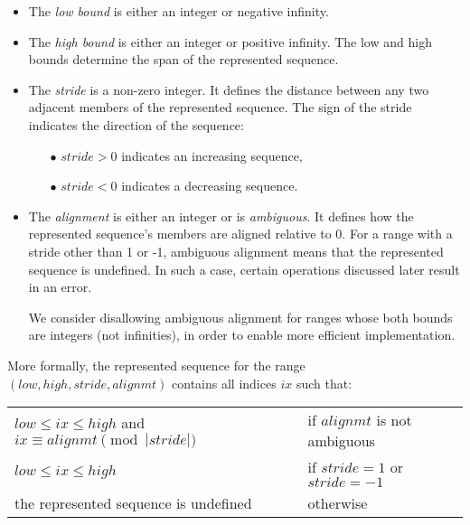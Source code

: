 \begin{itemize}

\item The \emph{low bound} is either an integer or negative infinity.

\item The \emph{high bound} is either an integer or positive infinity.
  The low and high bounds determine the span of the represented sequence.

\item The \emph{stride} is a non-zero integer.
  It defines the distance between any two adjacent members of the
  represented sequence.
  The sign of the stride indicates the direction of the sequence:
  \begin{itemize}
  \item[$\bullet$] $stride > 0$ indicates an increasing sequence,
  \item[$\bullet$] $stride < 0$ indicates a decreasing sequence.
  \end{itemize}

\item The \emph{alignment} is either an integer or is \emph{ambiguous}.
  It defines how the represented sequence's members are aligned relative to 0.
  For a range with a stride other than 1 or -1, 
  ambiguous alignment means that the represented sequence is undefined.
  In such a case, certain operations discussed later result in an error.

\begin{openissue}
We consider disallowing ambiguous alignment for ranges whose both bounds
are integers (not infinities), in order to enable more efficient
implementation.
\end{openissue}

\end{itemize}

More formally, the represented sequence for the range
$(low, high, stride, alignmt)$
contains all indices $ix$ such that:

\begin{tabular}{ll}

$low \leq ix \leq high$ and $ix \equiv alignmt \pmod{|stride|}$ &
 if $alignmt$ is not ambiguous \\
$low \leq ix \leq high$ &
 if $stride = 1$ or $stride = -1$ \\
the represented sequence is undefined &
 otherwise

\end{tabular}


